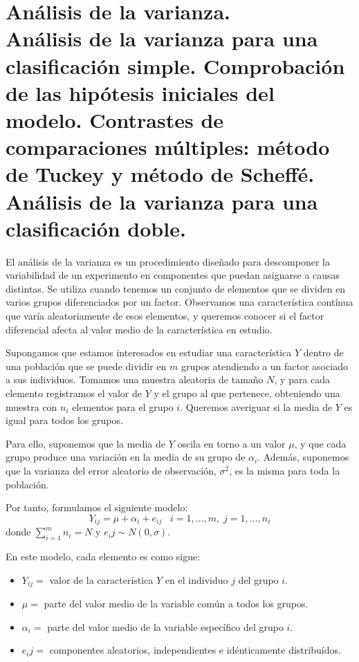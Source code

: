 \chapter[An\'alisis de la varianza.]{An\'alisis de la varianza. \\
\normalsize An\'alisis de la varianza para una clasificaci\'on simple. Comprobaci\'on de las hip\'otesis iniciales del modelo. Contrastes de comparaciones m\'ultiples: m\'etodo de Tuckey y m\'etodo de Scheff\'e. An\'alisis de la varianza para una clasificaci\'on doble.}

El an\'alisis de la varianza es un procedimiento dise\~nado para descomponer la variabilidad de un experimento en componentes que puedan asignarse a causas distintas. Se utiliza cuando tenemos un conjunto de elementos que se dividen en varios grupos diferenciados por un factor. Observamos una caracter\'istica cont\'inua que var\'ia aleatoriamente de esos elementos, y queremos conocer si el factor diferencial afecta al valor medio de la caracter\'istica en estudio.


Supongamos que estamos interesados en estudiar una caracter\'istica $Y$ dentro de una poblaci\'on que se puede dividir en $m$ grupos atendiendo a un factor asociado a sus individuos. Tomamos una muestra aleatoria de tama\~no $N$, y para cada elemento registramos el valor de $Y$ y el grupo al que pertenece, obteniendo una muestra con $n_i$ elementos para el grupo $i$. Queremos averiguar si la media de $Y$ es igual para todos los grupos.

Para ello, suponemos que la media de $Y$ oscila en torno a un valor $\mu$, y que cada grupo produce una variaci\'on en la media de su grupo de $\alpha_i$. Adem\'as, suponemos que la varianza del error aleatorio de observaci\'on, $\sigma^2$, es la misma para toda la poblaci\'on.

Por tanto, formulamos el siguiente modelo:
\[Y_{ij}=\mu+\alpha_i+e_{ij}\;\;\;i=1,\ldots,m,\;j=1,\ldots,n_i\]
donde $\sum_{i=1}^{m}n_i=N$ y $e_ij\sim N(0,\sigma)$.

En este modelo, cada elemento es como sigue:
\begin{itemize}
\item $Y_{ij} =$ valor de la caracter\'istica $Y$ en el individuo $j$ del grupo $i$.
\item $\mu =$ parte del valor medio de la variable com\'un a todos los grupos.
\item $\alpha_i = $ parte del valor medio de la variable espec\'ifico del grupo $i$.
\item $e_ij=$ componentes aleatorios, independientes e id\'enticamente distribu\'idos.
\end{itemize}

